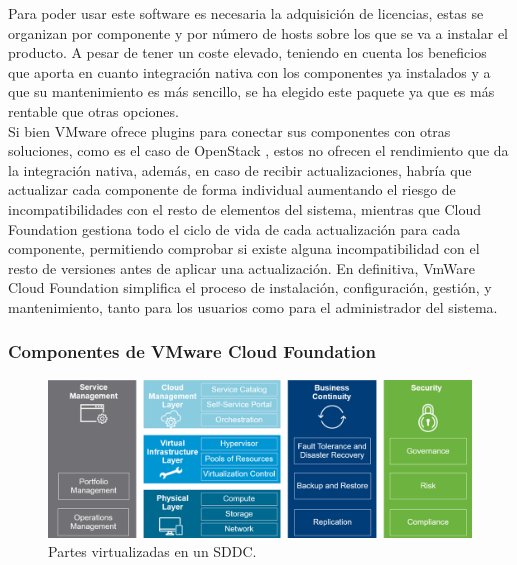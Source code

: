 Para poder usar este software es necesaria la adquisición de licencias, estas se organizan por componente y por número de hosts sobre los que se va a instalar el producto. A pesar de tener un coste elevado, teniendo en cuenta los beneficios que aporta en cuanto integración nativa con los componentes ya instalados y a que su mantenimiento es más sencillo, se ha elegido este paquete ya que es más rentable que otras opciones. \\
Si bien VMware ofrece plugins para conectar sus componentes con otras soluciones, como es el caso de OpenStack \cite{opestackintegrated}, estos no ofrecen el rendimiento que da la integración nativa, además, en caso de recibir actualizaciones, habría que actualizar cada componente de forma individual aumentando el riesgo de incompatibilidades con el resto de elementos del sistema, mientras que Cloud Foundation gestiona todo el ciclo de vida de cada actualización para cada componente, permitiendo comprobar si existe alguna incompatibilidad con el resto de versiones antes de aplicar una actualización. En definitiva, VmWare Cloud Foundation simplifica el proceso de instalación, configuración, gestión, y mantenimiento, tanto para los usuarios como para el administrador del sistema.

\subsubsection{Componentes de VMware Cloud Foundation \cite{componentesCloudFound}}
\label{subsubsect:cfcomponents}

\begin{figure}[h!]
  \centering
  \includegraphics[width=1\textwidth]{imaxes/cap2recursos/SDDCoverview.png}
  \caption{Partes virtualizadas en un SDDC.}
  \label{fig:sddcoverview}
\end{figure}
\FloatBarrier

